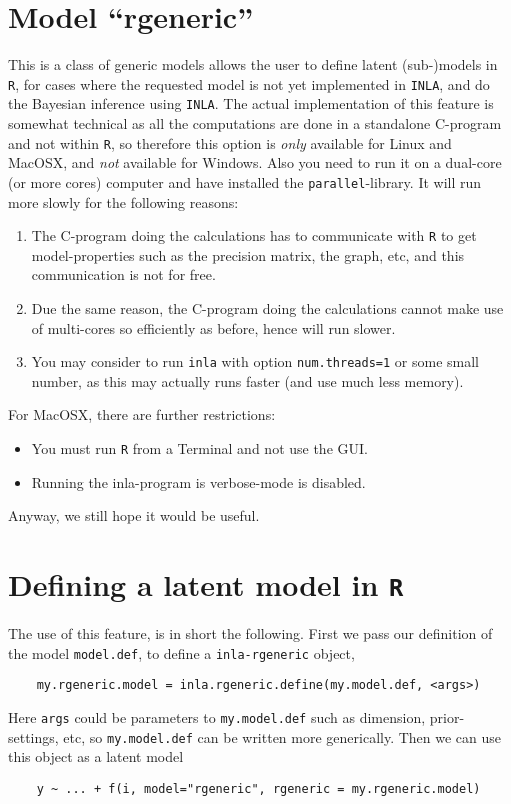 \documentclass[a4paper,11pt]{article}
\begin{document}
\section*{Model ``rgeneric''}


This is a class of generic models allows the user to define latent
(sub-)models in \texttt{R}, for cases where the requested model is not
yet implemented in \texttt{INLA}, and do the Bayesian inference using
\texttt{INLA}. 
The actual implementation of this feature is somewhat technical as all
the computations are done in a standalone C-program and not within
\texttt{R}, so therefore this option is \emph{only} available for
Linux and MacOSX, and \emph{not} available for Windows. Also you need
to run it on a dual-core (or more cores) computer and have installed
the \texttt{parallel}-library. It will run more slowly for the
following reasons:
\begin{enumerate}
\item The C-program doing the calculations has to communicate with
    \texttt{R} to get model-properties such as the precision matrix,
    the graph, etc, and this communication is not for free.
\item Due the same reason, the C-program doing the calculations cannot
    make use of multi-cores so efficiently as before, hence will run
    slower.
\item You may consider to run \texttt{inla} with option
    \texttt{num.threads=1} or some small number, as this may actually
    runs faster (and use much less memory).
\end{enumerate}
For MacOSX, there are further restrictions:
\begin{itemize}
\item You must run \texttt{R} from a Terminal and not use the GUI.
\item Running the inla-program is verbose-mode is disabled.
\end{itemize}
Anyway, we still hope it would be useful.

\section*{Defining a latent model in \texttt{R}}

The use of this feature, is in short the following. First we pass our
definition of the model \texttt{model.def}, to define a
\texttt{inla-rgeneric} object,
\begin{verbatim}
    my.rgeneric.model = inla.rgeneric.define(my.model.def, <args>)
\end{verbatim}
Here \texttt{args} could be parameters to \texttt{my.model.def}
such as dimension, prior-settings, etc, so \texttt{my.model.def} can
be written more generically.  Then we can use this object as a latent
model
\begin{verbatim}
    y ~ ... + f(i, model="rgeneric", rgeneric = my.rgeneric.model)
\end{verbatim}
\end{document}

